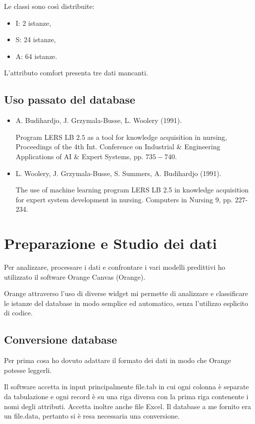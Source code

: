 \documentclass[a4paper, 12p]{report}
\begin{document}
Le classi sono così distribuite:
\begin{itemize}
\item I: 2 istanze,
\item S: 24 istanze,
\item A: 64 istanze.
\end{itemize}
L'attributo comfort presenta tre dati mancanti.
\section{Uso passato del database}
\begin{itemize}
\item  A. Budihardjo, J. Grzymala-Busse, L. Woolery (1991). 

Program LERS LB $2.5$ as a tool for knowledge acquisition in nursing, Proceedings of the 4th Int. Conference on Industrial \& Engineering Applications of AI \& Expert Systems, pp. $735-740.$
\item L. Woolery, J. Grzymala-Busse, S. Summers, A. Budihardjo (1991). 

The use of machine learning program LERS LB 2.5 in knowledge acquisition for expert system development in nursing. Computers in Nursing 9, pp. 227-234.			
\end{itemize}
\chapter{Preparazione e Studio dei dati}
Per analizzare, processare i dati e confrontare i vari modelli predittivi ho utilizzato il software Orange Canvas (Orange).
 
Orange attraverso l'uso di diverse widget mi permette di analizzare e classificare le istanze del database in modo semplice ed automatico, senza l'utilizzo esplicito di codice. 

\section{Conversione database}
\noindent Per prima cosa ho dovuto adattare il formato dei dati in modo che Orange potesse leggerli. 

\noindent Il software accetta in input principalmente file.tab in cui ogni colonna è separate da tabulazione e ogni record è su una riga diversa con la prima riga contenente i nomi degli attributi. Accetta inoltre anche file Excel. 
Il database a me fornito era un file.data, pertanto si è resa necessaria una conversione.
\end{document}

